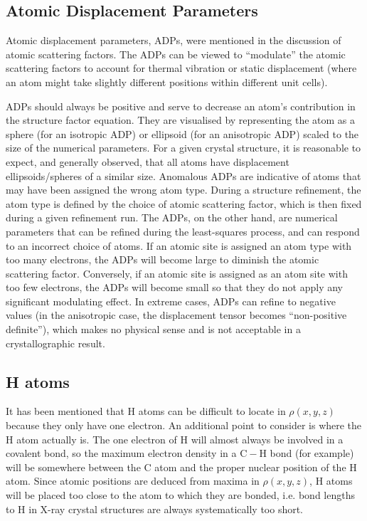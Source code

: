 \documentclass{article}
\theoremstyle{plain}\theoremheaderfont{\normalfont\itshape}\theorembodyfont{\rmfamily}\theoremseparator{.}\newtheorem*{rem}{Remark}\newtheorem*{ex}{Example}\newtheorem*{proof}{Proof}\newtheorem*{altp}{Alternative proof}
\theoremstyle{plain}\theoremheaderfont{\normalfont\bfseries}\theorembodyfont{\rmfamily}\theoremseparator{.}\newtheorem{thm}{Theorem}[section]\newtheorem{lem}[thm]{Lemma}\newtheorem{prop}[thm]{Proposition}\newtheorem*{cor}{Corollary}\newtheorem{defn}[thm]{Definition}\newtheorem{clm}[thm]{Claim}\newtheorem{clminproof}{Claim}\newtheorem*{law}{Law}\newtheorem{pos}[thm]{Postulate}
\theoremstyle{break}\theoremheaderfont{\normalfont\itshape}\theorembodyfont{\rmfamily}\theoremseparator{.\medskip}\newtheorem*{proofskip}{Proof}\newtheorem*{exs}{Examples}\newtheorem*{rems}{Remarks}
\theoremstyle{break}\theoremheaderfont{\normalfont\bfseries}\theorembodyfont{\rmfamily}\theoremseparator{.\medskip}\newtheorem{lemskip}[thm]{Lemma}\newtheorem{defnskip}[thm]{Definition}\newtheorem{propskip}[thm]{Proposition}\newtheorem{thmskip}[thm]{Theorem}
\numberwithin{equation}{section}
\begin{document}
    \subsection{Atomic Displacement Parameters}
    Atomic displacement parameters, ADPs, were mentioned in the discussion of atomic scattering factors. The ADPs can be viewed to ``modulate'' the atomic scattering factors to account for thermal vibration or static displacement (where an atom might take slightly different positions within different unit cells).

    ADPs should always be positive and serve to decrease an atom's contribution in the structure factor equation. They are visualised by representing the atom as a sphere (for an isotropic ADP) or ellipsoid (for an anisotropic ADP) scaled to the size of the numerical parameters. For a given crystal structure, it is reasonable to expect, and generally observed, that all atoms have displacement ellipsoids/spheres of a similar size. Anomalous ADPs are indicative of atoms that may have been assigned the wrong atom type. During a structure refinement, the atom type is defined by the choice of atomic scattering factor, which is then fixed during a given refinement run. The ADPs, on the other hand, are numerical parameters that can be refined during the least-squares process, and can respond to an incorrect choice of atoms. If an atomic site is assigned an atom type with too many electrons, the ADPs will become large to diminish the atomic scattering factor. Conversely, if an atomic site is assigned as an atom site with too few electrons, the ADPs will become small so that they do not apply any significant modulating effect. In extreme cases, ADPs can refine to negative values (in the anisotropic case, the displacement tensor becomes ``non-positive definite''), which makes no physical sense and is not acceptable in a crystallographic result.

    \subsection{H atoms}
    It has been mentioned that H atoms can be difficult to locate in \(\rho(x,y,z)\) because they only have one electron. An additional point to consider is where the H atom actually is. The one electron of H will almost always be involved in a covalent bond, so the maximum electron density in a \(\mathrm{C-H}\) bond (for example) will be somewhere between the C atom and the proper nuclear position of the H atom. Since atomic positions are deduced from maxima in \(\rho(x,y,z)\), H atoms will be placed too close to the atom to which they are bonded, i.e. bond lengths to H in X-ray crystal structures are always systematically too short.
    
\end{document}
